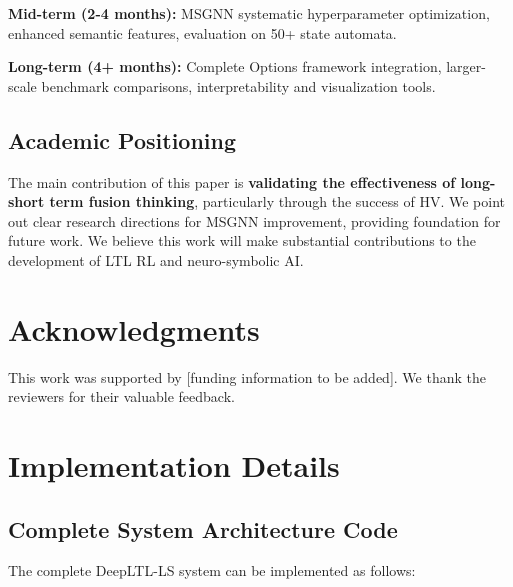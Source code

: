 \documentclass[conference]{IEEEtran}
\begin{document}
\textbf{Mid-term (2-4 months):} MSGNN systematic hyperparameter optimization, enhanced semantic features, evaluation on 50+ state automata.

\textbf{Long-term (4+ months):} Complete Options framework integration, larger-scale benchmark comparisons, interpretability and visualization tools.

\subsection{Academic Positioning}

The main contribution of this paper is \textbf{validating the effectiveness of long-short term fusion thinking}, particularly through the success of HV. We point out clear research directions for MSGNN improvement, providing foundation for future work. We believe this work will make substantial contributions to the development of LTL RL and neuro-symbolic AI.

\section*{Acknowledgments}

This work was supported by [funding information to be added]. We thank the reviewers for their valuable feedback.

\appendix

\section{Implementation Details}
\label{sec:appendix_a}

\subsection{Complete System Architecture Code}

The complete DeepLTL-LS system can be implemented as follows:
\end{document}
